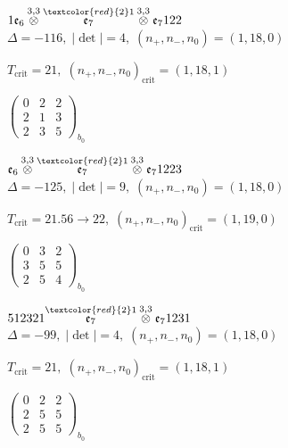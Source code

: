 \documentclass[10pt]{article}
\begin{document}
$1\mathfrak{e}_6\overset{3,3}{\otimes}\overset{\textcolor{red}{2}1}{\mathfrak{e}_7}\overset{3,3}{\otimes}\mathfrak{e}_7122$ \quad $\Delta=-116,\; |\det|=4,\; (n_+,n_-,n_0)=(1,18,0)$

\hspace{1em}$T_{\text{crit}}=21,\; (n_+,n_-,n_0)_{\text{crit}}=(1,18,1)$

\hspace{2em}$\left(\begin{smallmatrix}0 & 2 & 2 \\ 2 & 1 & 3 \\ 2 & 3 & 5\end{smallmatrix}\right)_{\!b_0}$

\smallskip

$\mathfrak{e}_6\overset{3,3}{\otimes}\overset{\textcolor{red}{2}1}{\mathfrak{e}_7}\overset{3,3}{\otimes}\mathfrak{e}_71223$ \quad $\Delta=-125,\; |\det|=9,\; (n_+,n_-,n_0)=(1,18,0)$

\hspace{1em}$T_{\text{crit}}=21.56 \to 22,\; (n_+,n_-,n_0)_{\text{crit}}=(1,19,0)$

\hspace{2em}$\left(\begin{smallmatrix}0 & 3 & 2 \\ 3 & 5 & 5 \\ 2 & 5 & 4\end{smallmatrix}\right)_{\!b_0}$

\smallskip

$512321\overset{\textcolor{red}{2}1}{\mathfrak{e}_7}\overset{3,3}{\otimes}\mathfrak{e}_71231$ \quad $\Delta=-99,\; |\det|=4,\; (n_+,n_-,n_0)=(1,18,0)$

\hspace{1em}$T_{\text{crit}}=21,\; (n_+,n_-,n_0)_{\text{crit}}=(1,18,1)$

\hspace{2em}$\left(\begin{smallmatrix}0 & 2 & 2 \\ 2 & 5 & 5 \\ 2 & 5 & 5\end{smallmatrix}\right)_{\!b_0}$

\smallskip
\end{document}
